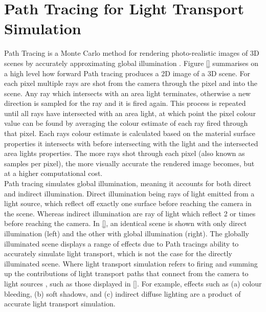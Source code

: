 \documentclass[ %
                    author={Callum Pearce},
                supervisor={Dr. Neill Campbell},
                    degree={MEng},
                     title={How effective are Temporal difference learning methods for reducing the number of zero contribution light paths while still accurately approximating Global Illumination in Path tracing?},
                  subtitle={},
                      type={research},
                      year={2019} ]{dissertation}
\begin{document}
\section{Path Tracing for Light Transport Simulation}
\label{sec:conceptual_path_trace}
Path Tracing is a Monte Carlo method for rendering photo-realistic images of 3D 
scenes by accurately approximating global illumination \cite{christensen2016path}.
Figure \ref{} summarises on a high level how forward Path tracing produces a 
2D image of a 3D scene. For each pixel multiple rays are shot from the camera through the 
pixel and into the scene. Any ray which intersects with an area light terminates, 
otherwise a new direction is sampled for the ray and it is fired again. This process 
is repeated until all rays have intersected with an area light, at which point the pixel 
colour value can  be found by averaging the colour estimate of each ray fired 
through that pixel. Each rays colour estimate is calculated based on the material 
surface properties it intersects with before intersecting with the light and the
intersected area lights properties. The more rays shot through each pixel (also 
known as samples per pixel), the more visually accurate the rendered image 
becomes, but at a higher computational cost.\\


Path tracing simulates global illumination, meaning it accounts for both direct and 
indirect illumination. Direct illumination being rays of light emitted from a light 
source, which reflect off exactly one surface before reaching the camera in the 
scene. Whereas indirect illumination are ray of light which reflect 2 or times before
reaching the camera. In \ref{}, an identical scene is shown with only direct illumination
(left) and the other with global illumination (right). The globally illuminated scene displays
a range of effects due to Path tracings ability to accurately simulate light transport, 
which is not the case for the directly illuminated scene. Where light transport simulation
refers to firing and summing up the contributions of light transport paths that connect from the
camera to light sources \cite{keller2016path}, such as those displayed in \ref{}. For 
example, effects such as (a) colour bleeding, (b) soft shadows, and (c) indirect diffuse lighting
are a product of accurate light transport simulation. \\
\end{document}
